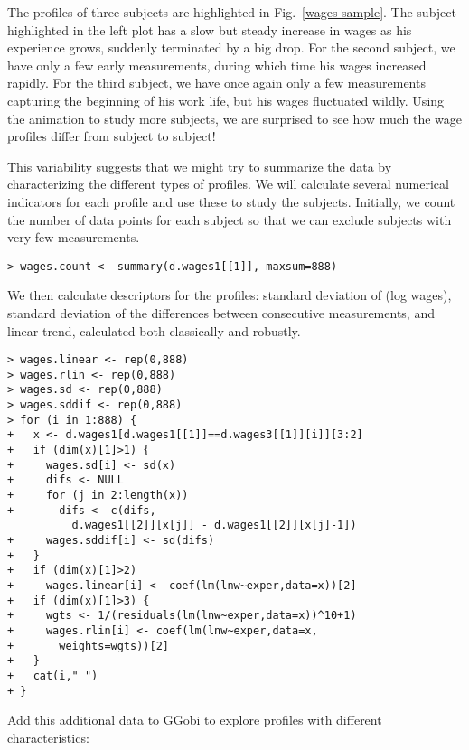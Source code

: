 
\noindent The profiles of three subjects are highlighted in
Fig.~\ref{wages-sample}.  The subject highlighted in the left plot has
a slow but steady increase in wages as his experience grows, suddenly
terminated by a big drop.  For the second subject, we have only a few
early measurements, during which time his wages increased rapidly. For
the third subject, we have once again only a few measurements
capturing the beginning of his work life, but his wages fluctuated
wildly.  Using the animation to study more subjects, we are surprised
to see how much the wage profiles differ from subject to subject!

This variability suggests that we might try to summarize the data by
characterizing the different types of profiles. We will calculate
several numerical indicators for each profile and use these to study
the subjects. Initially, we count the number of data points for each
subject so that we can exclude subjects with very few measurements. 

\begin{verbatim}
> wages.count <- summary(d.wages1[[1]], maxsum=888)
\end{verbatim}

\noindent 
We then calculate descriptors for the profiles: standard
deviation of  (log wages), standard deviation of the
differences between consecutive measurements, and linear trend,
calculated both classically and robustly.

\newpage
\begin{verbatim}
> wages.linear <- rep(0,888)
> wages.rlin <- rep(0,888)
> wages.sd <- rep(0,888)
> wages.sddif <- rep(0,888)
> for (i in 1:888) {
+   x <- d.wages1[d.wages1[[1]]==d.wages3[[1]][i]][3:2]
+   if (dim(x)[1]>1) {
+     wages.sd[i] <- sd(x)
+     difs <- NULL
+     for (j in 2:length(x))
+       difs <- c(difs, 
          d.wages1[[2]][x[j]] - d.wages1[[2]][x[j]-1])
+     wages.sddif[i] <- sd(difs)
+   }
+   if (dim(x)[1]>2)
+     wages.linear[i] <- coef(lm(lnw~exper,data=x))[2]
+   if (dim(x)[1]>3) {
+     wgts <- 1/(residuals(lm(lnw~exper,data=x))^10+1) 
+     wages.rlin[i] <- coef(lm(lnw~exper,data=x,
+       weights=wgts))[2]
+   }
+   cat(i," ")
+ }
\end{verbatim}

\noindent 
Add this additional data to GGobi to explore profiles with different
characteristics:

